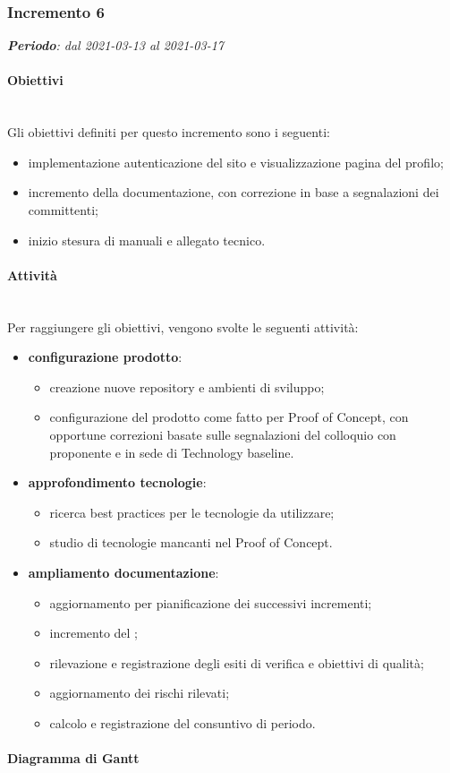 \subsubsection{Incremento 6}
\textit{\textbf{Periodo}: dal 2021-03-13 al 2021-03-17}

\paragraph{Obiettivi}\\
Gli obiettivi definiti per questo incremento sono i seguenti:
\begin{itemize}
\item implementazione autenticazione del sito e visualizzazione pagina del profilo;
\item incremento della documentazione, con correzione in base a segnalazioni dei committenti;
\item inizio stesura di manuali e allegato tecnico.
\end{itemize}

\paragraph{Attività}\\
Per raggiungere gli obiettivi, vengono svolte le seguenti attività:
\begin{itemize}

\item \textbf{configurazione prodotto}:
\begin{itemize}
\item creazione nuove repository e ambienti di sviluppo;
\item configurazione del prodotto come fatto per Proof of Concept, con opportune correzioni basate sulle segnalazioni del colloquio con proponente e in sede di Technology baseline.
\end{itemize}

\item \textbf{approfondimento tecnologie}:
\begin{itemize}
\item ricerca best practices per le tecnologie da utilizzare;
\item studio di tecnologie mancanti nel Proof of Concept.
\end{itemize}

\item \textbf{ampliamento documentazione}:
\begin{itemize}
\item aggiornamento  per pianificazione dei successivi incrementi;
\item incremento del ;
\item rilevazione e registrazione degli esiti di verifica e obiettivi di qualità;
\item aggiornamento dei rischi rilevati;
\item calcolo e registrazione del consuntivo di periodo.
\end{itemize}

\end{itemize}
\paragraph{Diagramma di Gantt}\\